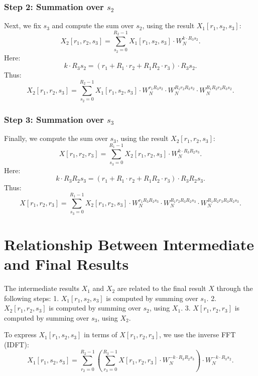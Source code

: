 \documentclass{article}
\begin{document}
\subsubsection{Step 2: Summation over \( s_2 \)}
Next, we fix \( s_3 \) and compute the sum over \( s_2 \), using the result \( X_1[r_1, s_2, s_3] \):
\[
X_2[r_1, r_2, s_3] = \sum_{s_2=0}^{R_2-1} X_1[r_1, s_2, s_3] \cdot W_N^{k \cdot R_3 s_2}.
\]
Here:
\[
k \cdot R_3 s_2 = (r_1 + R_1 \cdot r_2 + R_1 R_2 \cdot r_3) \cdot R_3 s_2.
\]
Thus:
\[
X_2[r_1, r_2, s_3] = \sum_{s_2=0}^{R_2-1} X_1[r_1, s_2, s_3] \cdot W_N^{r_1 R_3 s_2} \cdot W_N^{R_1 r_2 R_3 s_2} \cdot W_N^{R_1 R_2 r_3 R_3 s_2}.
\]

\subsubsection{Step 3: Summation over \( s_3 \)}
Finally, we compute the sum over \( s_3 \), using the result \( X_2[r_1, r_2, s_3] \):
\[
X[r_1, r_2, r_3] = \sum_{s_3=0}^{R_1-1} X_2[r_1, r_2, s_3] \cdot W_N^{k \cdot R_3 R_2 s_3}.
\]
Here:
\[
k \cdot R_3 R_2 s_3 = (r_1 + R_1 \cdot r_2 + R_1 R_2 \cdot r_3) \cdot R_3 R_2 s_3.
\]
Thus:
\[
X[r_1, r_2, r_3] = \sum_{s_3=0}^{R_1-1} X_2[r_1, r_2, s_3] \cdot W_N^{r_1 R_3 R_2 s_3} \cdot W_N^{R_1 r_2 R_3 R_2 s_3} \cdot W_N^{R_1 R_2 r_3 R_3 R_2 s_3}.
\]

\section{Relationship Between Intermediate and Final Results}
The intermediate results \( X_1 \) and \( X_2 \) are related to the final result \( X \) through the following steps:
1. \( X_1[r_1, s_2, s_3] \) is computed by summing over \( s_1 \).
2. \( X_2[r_1, r_2, s_3] \) is computed by summing over \( s_2 \), using \( X_1 \).
3. \( X[r_1, r_2, r_3] \) is computed by summing over \( s_3 \), using \( X_2 \).

To express \( X_1[r_1, s_2, s_3] \) in terms of \( X[r_1, r_2, r_3] \), we use the inverse FFT (IDFT):
\[
X_1[r_1, s_2, s_3] = \sum_{r_2=0}^{R_2-1} \left( \sum_{r_3=0}^{R_3-1} X[r_1, r_2, r_3] \cdot W_N^{-k \cdot R_3 R_2 s_3} \right) \cdot W_N^{-k \cdot R_3 s_2}.
\]
\end{document}
